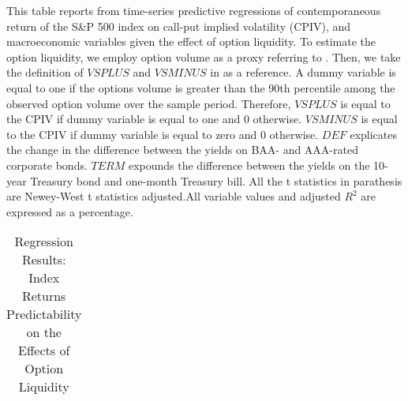 





\begin{table}[h]

\caption{Regression Results: Index Returns Predictability on the Effects of Option Liquidity}\label{table:Volume}
\begin{threeparttable}

\medskip
\begin{spacing}{1.1}
{\footnotesize  
This table reports from time-series predictive regressions of contemporaneous return of the S\&P 500 index on call-put implied volatility (CPIV), and macroeconomic variables given the effect of option liquidity. To estimate the option liquidity, we employ option volume as a proxy referring to \textcite{chang2018implied}. Then, we take the definition of $VSPLUS$ and $VSMINUS$ in \textcite{atilgan2015implied} as a reference. A dummy variable is equal to one if the options volume is greater than the 90th percentile among the observed option volume over the sample period. Therefore, $VSPLUS$ is equal to the CPIV if dummy variable is equal to one and 0 otherwise. $VSMINUS$ is equal to the CPIV if dummy variable is equal to zero and 0 otherwise. $DEF$ explicates the change in the difference between the yields on BAA- and AAA-rated corporate bonds. $TERM$ expounds the difference between the yields on the 10-year Treasury bond and one-month Treasury bill. All the t statistics in parathesis are Newey-West t statistics adjusted.All variable values and adjusted $R^{2}$ are expressed as a percentage.   
}
\end{spacing}
\medskip
\medskip
\footnotesize
\centering
\begin{tabular}{ccccccccccccccc}
\toprule


\end{tabular}
\end{threeparttable}
\end{table}
